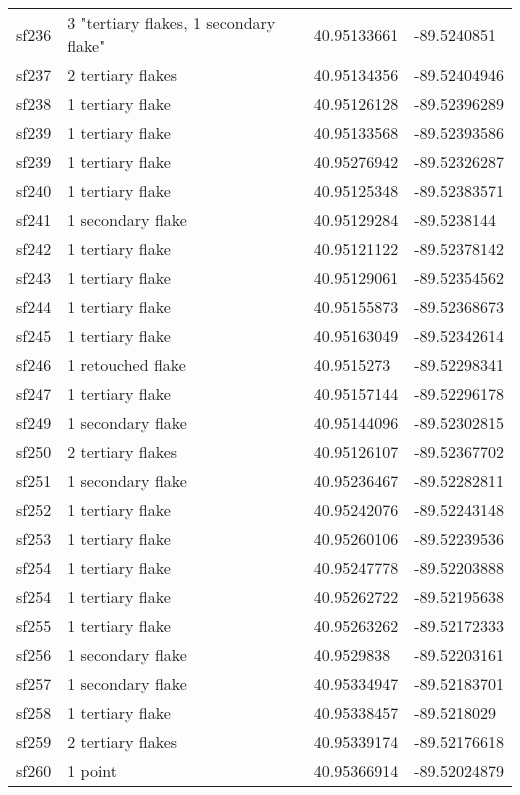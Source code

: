 \begin{longtable}{p{1cm}p{6cm}ll}
	sf236 & 3 "tertiary flakes, 1 secondary flake" & 40.95133661 & -89.5240851\\
	sf237 & 2 tertiary flakes & 40.95134356 & -89.52404946\\
	sf238 & 1 tertiary flake & 40.95126128 & -89.52396289\\
	sf239 & 1 tertiary flake & 40.95133568 & -89.52393586\\
	sf239 & 1 tertiary flake & 40.95276942 & -89.52326287\\
	sf240 & 1 tertiary flake & 40.95125348 & -89.52383571\\
	sf241 & 1 secondary flake & 40.95129284 & -89.5238144\\
	sf242 & 1 tertiary flake & 40.95121122 & -89.52378142\\
	sf243 & 1 tertiary flake & 40.95129061 & -89.52354562\\
	sf244 & 1 tertiary flake & 40.95155873 & -89.52368673\\
	sf245 & 1 tertiary flake & 40.95163049 & -89.52342614\\
	sf246 & 1 retouched flake & 40.9515273 & -89.52298341\\
	sf247 & 1 tertiary flake & 40.95157144 & -89.52296178\\

	sf249 & 1 secondary flake & 40.95144096 & -89.52302815\\
	sf250 & 2 tertiary flakes & 40.95126107 & -89.52367702\\
	sf251 & 1 secondary flake & 40.95236467 & -89.52282811\\
	sf252 & 1 tertiary flake & 40.95242076 & -89.52243148\\
	sf253 & 1 tertiary flake & 40.95260106 & -89.52239536\\
	sf254 & 1 tertiary flake & 40.95247778 & -89.52203888\\
	sf254 & 1 tertiary flake & 40.95262722 & -89.52195638\\
	sf255 & 1 tertiary flake & 40.95263262 & -89.52172333\\
	sf256 & 1 secondary flake & 40.9529838 & -89.52203161\\
	sf257 & 1 secondary flake & 40.95334947 & -89.52183701\\
	sf258 & 1 tertiary flake & 40.95338457 & -89.5218029\\
	sf259 & 2 tertiary flakes & 40.95339174 & -89.52176618\\
	sf260 & 1 point & 40.95366914 & -89.52024879\\


\end{longtable}
